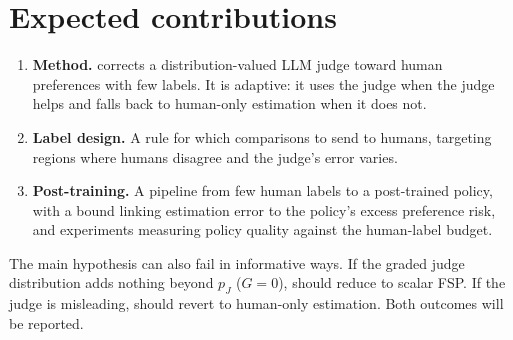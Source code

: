 \section{Expected contributions}
\label{sec:contributions}

\begin{enumerate}
  \item \textbf{Method.} \dfsp{} corrects a distribution-valued LLM judge toward human preferences
        with few labels. It is adaptive: it uses the judge when the judge helps and falls back to
        human-only estimation when it does not.
  \item \textbf{Label design.} A rule for which comparisons to send to humans, targeting regions
        where humans disagree and the judge's error varies.
  \item \textbf{Post-training.} A pipeline from few human labels to a post-trained policy, with a
        bound linking estimation error to the policy's excess preference risk, and experiments
        measuring policy quality against the human-label budget.
\end{enumerate}

\noindent The main hypothesis can also fail in informative ways. If the graded judge distribution
adds nothing beyond $p_J$ ($G=0$), \dfsp{} should reduce to scalar FSP. If the judge is misleading,
\dfsp{} should revert to human-only estimation. Both outcomes will be reported.

